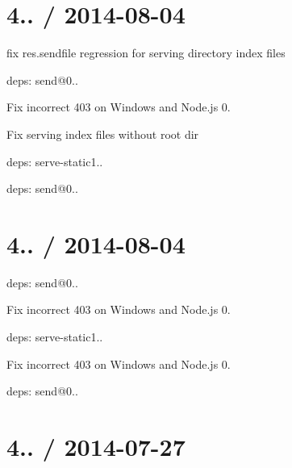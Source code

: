{\ttfamily \section*{4.. / 2014-\/08-\/04 }}

{\ttfamily }

{\ttfamily 
\begin{DoxyItemize}
\item fix {\ttfamily res.\+sendfile} regression for serving directory index files
\item deps\+: send@0..
\begin{DoxyItemize}
\item Fix incorrect 403 on Windows and Node.\+js 0.
\item Fix serving index files without root dir
\end{DoxyItemize}
\item deps\+: serve-\/static1..
\begin{DoxyItemize}
\item deps\+: send@0..
\end{DoxyItemize}
\end{DoxyItemize}}

{\ttfamily \section*{4.. / 2014-\/08-\/04 }}

{\ttfamily }

{\ttfamily 
\begin{DoxyItemize}
\item deps\+: send@0..
\begin{DoxyItemize}
\item Fix incorrect 403 on Windows and Node.\+js 0.
\end{DoxyItemize}
\item deps\+: serve-\/static1..
\begin{DoxyItemize}
\item Fix incorrect 403 on Windows and Node.\+js 0.
\item deps\+: send@0..
\end{DoxyItemize}
\end{DoxyItemize}}

{\ttfamily \section*{4.. / 2014-\/07-\/27 }}

